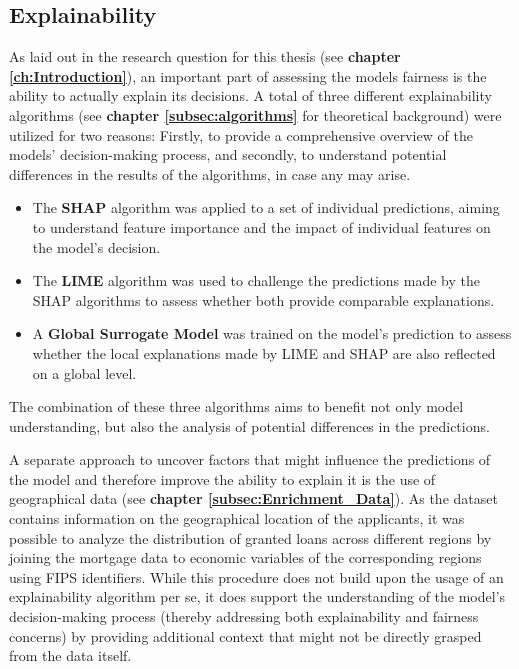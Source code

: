 \subsection{Explainability}\label{subsec:Explainability}

As laid out in the research question for this thesis (see \textbf{chapter \ref{ch:Introduction}}), an important part of assessing the models fairness is the ability to actually explain its decisions.
A total of three different explainability algorithms (see \textbf{chapter \ref{subsec:algorithms}} for theoretical background) were utilized for two reasons: Firstly, to provide a comprehensive overview of the models' decision-making process, and secondly, to understand potential differences in the results of the algorithms, in case any may arise.
\begin{itemize}
    \item The \textbf{SHAP} algorithm was applied to a set of individual predictions, aiming to understand feature importance and the impact of individual features on the model's decision.
    \item The \textbf{LIME} algorithm was used to challenge the predictions made by the SHAP algorithms to assess whether both provide comparable explanations.
    \item A \textbf{Global Surrogate Model} was trained on the model's prediction to assess whether the local explanations made by LIME and SHAP are also reflected on a global level.
\end{itemize}
The combination of these three algorithms aims to benefit not only model understanding, but also the analysis of potential differences in the predictions.

A separate approach to uncover factors that might influence the predictions of the model and therefore improve the ability to explain it is the use of geographical data (see \textbf{chapter \ref{subsec:Enrichment_Data}}). As the dataset contains information on the geographical location of the applicants, it was possible to analyze the distribution of granted loans across different regions by joining the mortgage data to economic variables of the corresponding regions using FIPS identifiers. 
While this procedure does not build upon the usage of an explainability algorithm per se, it does support the understanding of the model's decision-making process (thereby addressing both explainability and fairness concerns) by providing additional context that might not be directly grasped from the data itself.


